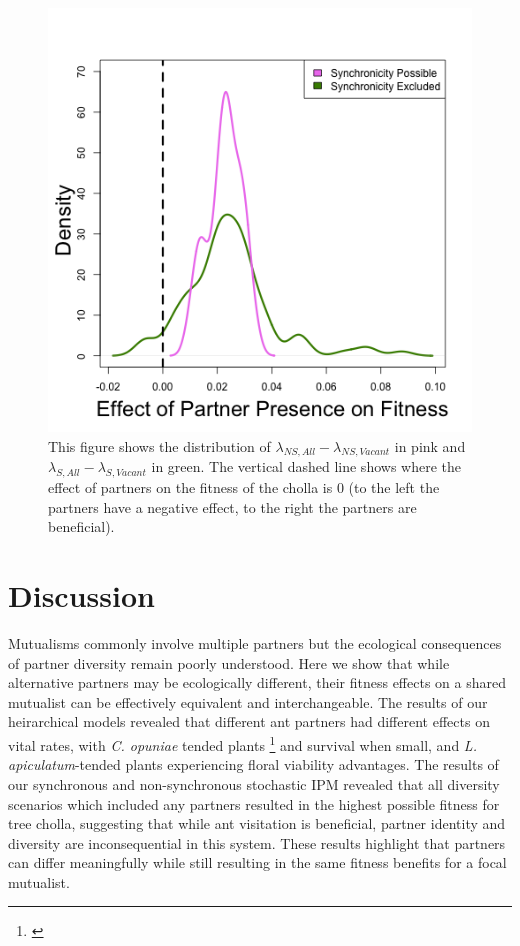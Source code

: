 \documentclass[11pt]{article}
\newcommand{\tom}[2]{{\color{red}{#1}}\footnote{\textit{\color{red}{#2}}}}
\begin{document}
\begin{figure}
	\includegraphics[width=\linewidth]{Figures/portfolio_effect.png}
	\caption{This figure shows the distribution of $\lambda_{NS,All}-\lambda_{NS,Vacant}$ in pink and $\lambda_{S,All}-\lambda_{S,Vacant}$ in green. The vertical dashed line shows where the effect of partners on the fitness of the cholla is 0 (to the left the partners have a negative effect, to the right the partners are beneficial).}
	\label{fig:Portfolio}
\end{figure}



\section*{Discussion}
Mutualisms commonly involve multiple partners but the ecological consequences of partner diversity remain poorly understood. 
Here we show that while alternative partners may be ecologically different, their fitness effects on a shared mutualist can be effectively equivalent and interchangeable.
The results of our heirarchical models revealed that different ant partners had different effects on vital rates, with \textit{C. opuniae} tended plants \tom{experiencing slight advantages in growth}{I don't think this is true if you look at my v1 figure.} and survival when small, and \textit{L. apiculatum}-tended plants experiencing floral viability advantages.
The results of our synchronous and non-synchronous stochastic IPM revealed that all diversity scenarios which included any partners resulted in the highest possible fitness for tree cholla, suggesting that while ant visitation is beneficial, partner identity and diversity are inconsequential in this system. 
These results highlight that partners can differ meaningfully while still resulting in the same fitness benefits for a focal mutualist.
\end{document}
